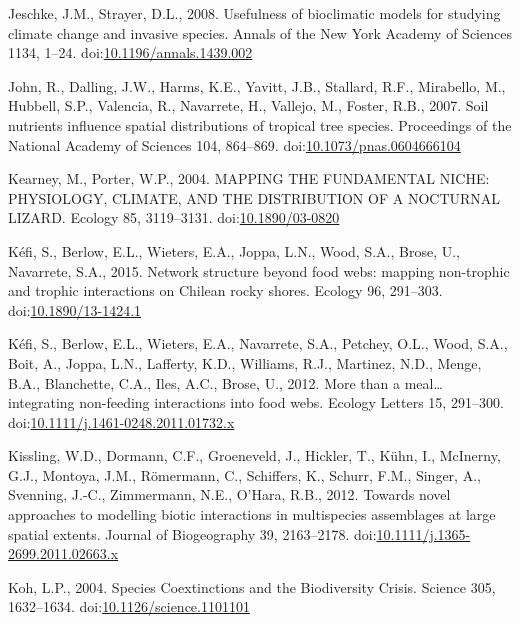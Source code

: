 \hypertarget{ref-Jeschke2008}{}
Jeschke, J.M., Strayer, D.L., 2008. Usefulness of bioclimatic models for
studying climate change and invasive species. Annals of the New York
Academy of Sciences 1134, 1--24.
doi:\href{https://doi.org/10.1196/annals.1439.002}{10.1196/annals.1439.002}

\hypertarget{ref-John2007}{}
John, R., Dalling, J.W., Harms, K.E., Yavitt, J.B., Stallard, R.F.,
Mirabello, M., Hubbell, S.P., Valencia, R., Navarrete, H., Vallejo, M.,
Foster, R.B., 2007. Soil nutrients influence spatial distributions of
tropical tree species. Proceedings of the National Academy of Sciences
104, 864--869.
doi:\href{https://doi.org/10.1073/pnas.0604666104}{10.1073/pnas.0604666104}

\hypertarget{ref-Kearney2004}{}
Kearney, M., Porter, W.P., 2004. MAPPING THE FUNDAMENTAL NICHE:
PHYSIOLOGY, CLIMATE, AND THE DISTRIBUTION OF A NOCTURNAL LIZARD. Ecology
85, 3119--3131.
doi:\href{https://doi.org/10.1890/03-0820}{10.1890/03-0820}

\hypertarget{ref-Kefi2015}{}
Kéfi, S., Berlow, E.L., Wieters, E.A., Joppa, L.N., Wood, S.A., Brose,
U., Navarrete, S.A., 2015. Network structure beyond food webs: mapping
non-trophic and trophic interactions on Chilean rocky shores. Ecology
96, 291--303.
doi:\href{https://doi.org/10.1890/13-1424.1}{10.1890/13-1424.1}

\hypertarget{ref-Kefi2012}{}
Kéfi, S., Berlow, E.L., Wieters, E.A., Navarrete, S.A., Petchey, O.L.,
Wood, S.A., Boit, A., Joppa, L.N., Lafferty, K.D., Williams, R.J.,
Martinez, N.D., Menge, B.A., Blanchette, C.A., Iles, A.C., Brose, U.,
2012. More than a meal\ldots{} integrating non-feeding interactions into
food webs. Ecology Letters 15, 291--300.
doi:\href{https://doi.org/10.1111/j.1461-0248.2011.01732.x}{10.1111/j.1461-0248.2011.01732.x}

\hypertarget{ref-Kissling2011}{}
Kissling, W.D., Dormann, C.F., Groeneveld, J., Hickler, T., Kühn, I.,
McInerny, G.J., Montoya, J.M., Römermann, C., Schiffers, K., Schurr,
F.M., Singer, A., Svenning, J.-C., Zimmermann, N.E., O'Hara, R.B., 2012.
Towards novel approaches to modelling biotic interactions in
multispecies assemblages at large spatial extents. Journal of
Biogeography 39, 2163--2178.
doi:\href{https://doi.org/10.1111/j.1365-2699.2011.02663.x}{10.1111/j.1365-2699.2011.02663.x}

\hypertarget{ref-Koh2004}{}
Koh, L.P., 2004. Species Coextinctions and the Biodiversity Crisis.
Science 305, 1632--1634.
doi:\href{https://doi.org/10.1126/science.1101101}{10.1126/science.1101101}

